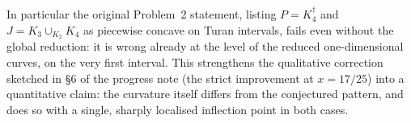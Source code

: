 \documentclass[11pt]{amsart}
\theoremstyle{definition}
\begin{document}
In particular the original Problem~2 statement, listing $P=K_4^\dagger$ and
$J=K_3\cup_{K_2}K_4$ as piecewise concave on Turan intervals, fails even
without the global reduction: it is wrong already at the level of the
reduced one-dimensional curves, on the very first interval.  This
strengthens the qualitative correction sketched in \S6 of the progress
note (the strict improvement at $x=17/25$) into a quantitative claim:
the curvature itself differs from the conjectured pattern, and does so
with a single, sharply localised inflection point in both cases.
\end{document}
